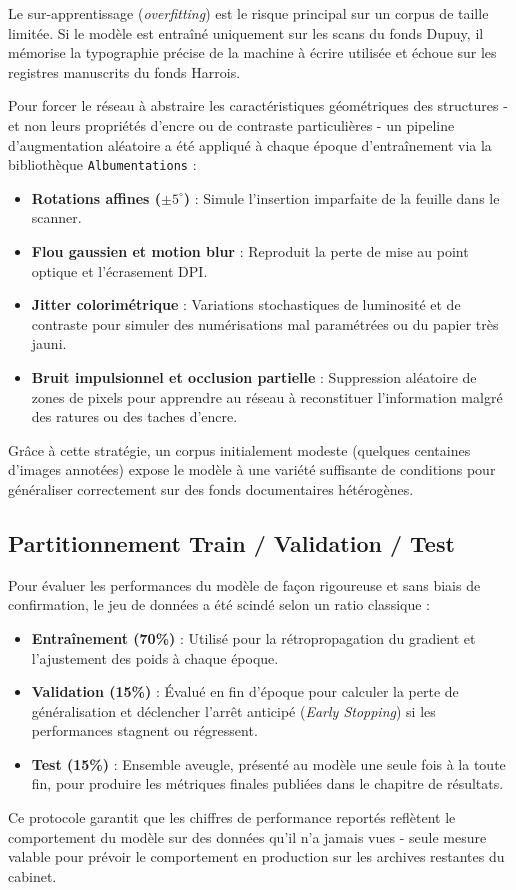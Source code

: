 Le sur-apprentissage (\textit{overfitting}) est le risque principal sur un corpus de taille limitée. Si le modèle est entraîné uniquement sur les scans du fonds Dupuy, il mémorise la typographie précise de la machine à écrire utilisée et échoue sur les registres manuscrits du fonds Harrois.

Pour forcer le réseau à abstraire les caractéristiques géométriques des structures - et non leurs propriétés d'encre ou de contraste particulières - un pipeline d'augmentation aléatoire a été appliqué à chaque époque d'entraînement via la bibliothèque \texttt{Albumentations} :

\begin{itemize}
    \item \textbf{Rotations affines ($\pm 5^\circ$)} : Simule l'insertion imparfaite de la feuille dans le scanner.
    \item \textbf{Flou gaussien et motion blur} : Reproduit la perte de mise au point optique et l'écrasement DPI.
    \item \textbf{Jitter colorimétrique} : Variations stochastiques de luminosité et de contraste pour simuler des numérisations mal paramétrées ou du papier très jauni.
    \item \textbf{Bruit impulsionnel et occlusion partielle} : Suppression aléatoire de zones de pixels pour apprendre au réseau à reconstituer l'information malgré des ratures ou des taches d'encre.
\end{itemize}

Grâce à cette stratégie, un corpus initialement modeste (quelques centaines d'images annotées) expose le modèle à une variété suffisante de conditions pour généraliser correctement sur des fonds documentaires hétérogènes.

\subsection{Partitionnement Train / Validation / Test}

Pour évaluer les performances du modèle de façon rigoureuse et sans biais de confirmation, le jeu de données a été scindé selon un ratio classique :
\begin{itemize}
    \item \textbf{Entraînement (70\%)} : Utilisé pour la rétropropagation du gradient et l'ajustement des poids à chaque époque.
    \item \textbf{Validation (15\%)} : Évalué en fin d'époque pour calculer la perte de généralisation et déclencher l'arrêt anticipé (\textit{Early Stopping}) si les performances stagnent ou régressent.
    \item \textbf{Test (15\%)} : Ensemble aveugle, présenté au modèle une seule fois à la toute fin, pour produire les métriques finales publiées dans le chapitre de résultats.
\end{itemize}

Ce protocole garantit que les chiffres de performance reportés reflètent le comportement du modèle sur des données qu'il n'a jamais vues - seule mesure valable pour prévoir le comportement en production sur les archives restantes du cabinet.
